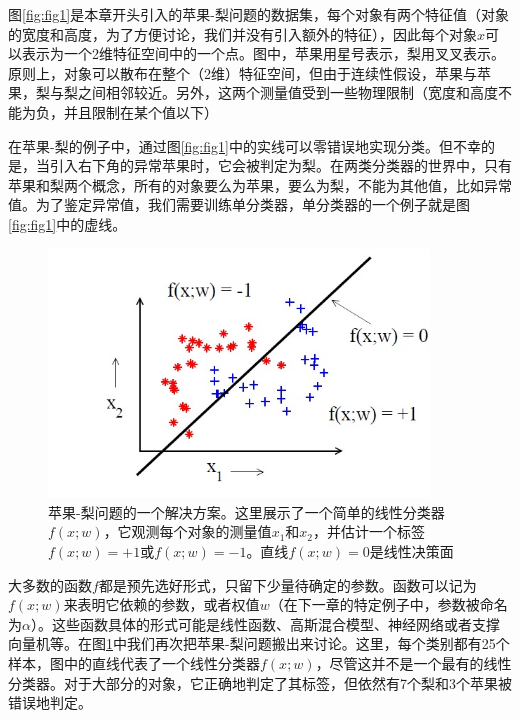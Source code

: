 \documentclass{ctexrep}
\begin{document}
图\ref{fig:fig1}是本章开头引入的苹果-梨问题的数据集，每个对象有两个特征值（对象的宽度和高度，为了方便讨论，我们并没有引入额外的特征），因此每个对象$x$可以表示为一个2维特征空间中的一个点。图中，苹果用星号表示，梨用叉叉表示。原则上，对象可以散布在整个（2维）特征空间，但由于连续性假设，苹果与苹果，梨与梨之间相邻较近。另外，这两个测量值受到一些物理限制（宽度和高度不能为负，并且限制在某个值以下）

在苹果-梨的例子中，通过图\ref{fig:fig1}中的实线可以零错误地实现分类。但不幸的是，当引入右下角的异常苹果时，它会被判定为梨。在两类分类器的世界中，只有苹果和梨两个概念，所有的对象要么为苹果，要么为梨，不能为其他值，比如异常值。为了鉴定异常值，我们需要训练单分类器，单分类器的一个例子就是图\ref{fig:fig1}中的虚线。

\begin{figure}[htbp]
  \centering
  \includegraphics[width=0.9\textwidth]{figure/fig2.jpg}
  \caption{苹果-梨问题的一个解决方案。这里展示了一个简单的线性分类器$f(x;w)$，它观测每个对象的测量值$x_1$和$x_2$，并估计一个标签$f(x;w)=+1$或$f(x;w)=-1$。直线$f(x;w)=0$是线性决策面}
  \label{fig:fig2}
\end{figure}

大多数的函数$f$都是预先选好形式，只留下少量待确定的参数。函数可以记为$f(x;w)$来表明它依赖的参数，或者权值$w$（在下一章的特定例子中，参数被命名为$\alpha$）。这些函数具体的形式可能是线性函数、高斯混合模型、神经网络或者支撑向量机等。在图\ref{fig:fig2}中我们再次把苹果-梨问题搬出来讨论。这里，每个类别都有25个样本，图中的直线代表了一个线性分类器$f(x;w)$，尽管这并不是一个最有的线性分类器。对于大部分的对象，它正确地判定了其标签，但依然有7个梨和3个苹果被错误地判定。
\end{document}
